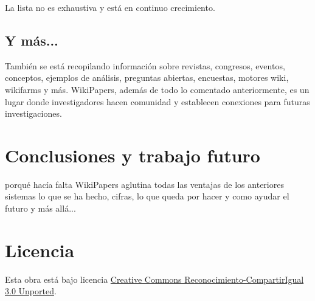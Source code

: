 \documentclass[11pt,twocolumn]{article}
\begin{document}
La lista no es exhaustiva y está en continuo crecimiento.

\subsection{Y más...}
También se está recopilando información sobre revistas, congresos, eventos, conceptos, ejemplos de análisis, preguntas abiertas, encuestas, motores wiki, wikifarms y más. WikiPapers, además de todo lo comentado anteriormente, es un lugar donde investigadores hacen comunidad y establecen conexiones para futuras investigaciones.

\section{Conclusiones y trabajo futuro}
porqué hacía falta WikiPapers
aglutina todas las ventajas de los anteriores sistemas
lo que se ha hecho, cifras,
lo que queda por hacer y como ayudar
el futuro y más allá...

        


\section{Licencia}
Esta obra está bajo licencia \href{http://creativecommons.org/licenses/by-sa/3.0/}{Creative Commons Reconocimiento-CompartirIgual 3.0 Unported}.
\end{document}
